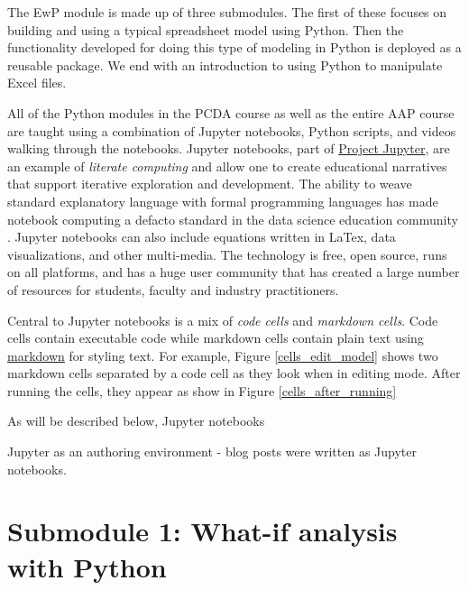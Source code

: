 \documentclass[ited,blindrev]{informs3}              %
\begin{document}
The EwP module is made up of three submodules. The first of these focuses on building and using a typical spreadsheet model using Python. Then the functionality developed for doing this type of modeling in Python is deployed as a reusable package. We end with an introduction to using Python to manipulate Excel files.



All of the Python modules in the PCDA course as well as the entire AAP course are taught using a combination of Jupyter notebooks, Python scripts, and videos walking through the notebooks. Jupyter notebooks, part of \href{https://jupyter.org/}{Project Jupyter}, are an example of \textit{literate computing} \cite{Jupyter_proposal} and allow one to create educational narratives that support iterative exploration and development. The ability to weave standard explanatory language with formal programming languages has made notebook computing a defacto standard in the data science education community \cite{perkel2018jupyter}. Jupyter notebooks can also include equations written in LaTex, data visualizations, and other multi-media. The technology is free, open source, runs on all platforms, and has a huge user community that has created a large number of resources for students, faculty and industry practitioners. 

Central to Jupyter notebooks is a mix of \textit{code cells} and \textit{markdown cells}. Code cells contain executable code while markdown cells contain plain text using \href{URL}{markdown} for styling text. For example, Figure \ref{cells_edit_model} shows two markdown cells separated by a code cell as they look when in editing mode. After running the cells, they appear as show in Figure \ref{cells_after_running}

As will be described below, Jupyter notebooks 

Jupyter as an authoring environment - blog posts were written as Jupyter notebooks.



\section{Submodule 1: What-if analysis with Python}
\end{document}
